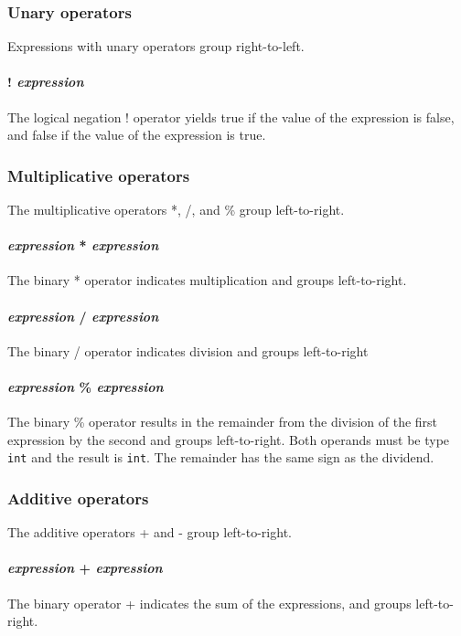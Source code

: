 \subsubsection{Unary operators}
Expressions with unary operators group right-to-left.

\paragraph{! \textit{expression}}
The logical negation ! operator yields true if the value of the expression is false, and false if the value of the expression is true. 

\subsubsection{Multiplicative operators}
The multiplicative operators *, /, and \% group left-to-right.

\paragraph{\textit{expression} * \textit{expression}}
The binary * operator indicates multiplication and groups left-to-right.

\paragraph{\textit{expression} / \textit{expression}}
The binary / operator indicates division and groups left-to-right 

\paragraph{\textit{expression} \% \textit{expression}}
The  binary \% operator results in the remainder from the division of the first expression by the second and groups left-to-right. Both operands must be type \texttt{int} and the result is \texttt{int}. The remainder has the same sign as the dividend.
\\
\subsubsection{Additive operators}
The additive operators + and - group left-to-right.

\paragraph{\textit{expression} + \textit{expression}}
The binary  operator + indicates the sum of the expressions, and groups left-to-right.

